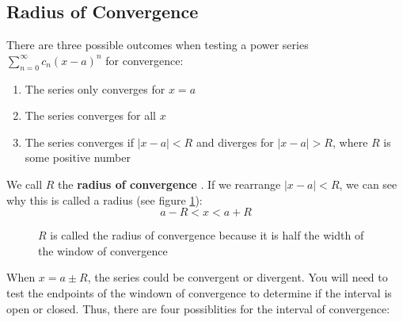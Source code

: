 \subsection{Radius of Convergence}
There are three possible outcomes when testing a power series $\sum_{n=0}^
\infty c_n (x-a)^n$ for convergence:
\begin{enumerate}
\item The series only converges for $x = a$
\item The series converges for all $x$
\item The series converges if $|x - a| < R$ and diverges for $|x - a| > R$, 
where $R$ is some positive number
\end{enumerate}

We call $R$ the \textbf{radius of convergence} . 
If we rearrange $|x - a| < R$, we can see why this is called a radius (see 
figure \ref{fig:radiusofconv}): 
$$a - R < x < a + R$$

\begin{figure}[htbp]
\centering
    \caption{$R$ is called the radius of convergence because it is half the 
    width of the window of convergence}
    \label{fig:radiusofconv}
\end{figure}

When $x = a \pm R$, the series could be convergent or divergent. You will need 
to test the endpoints of the windown of convergence to determine if the 
interval is open or closed. Thus, there are four possiblities for the interval 
of convergence:

